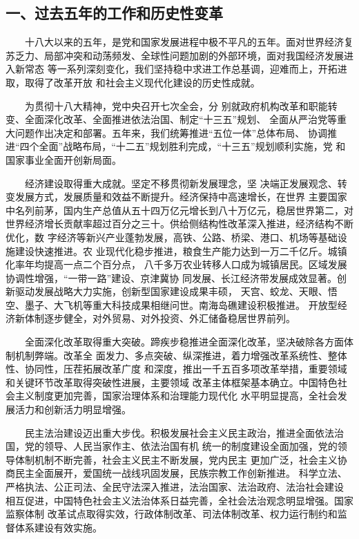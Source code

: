 \documentclass[11pt]{ctexart}
\begin{document}
{{{{\subsection{一、过去五年的工作和历史性变革}
\label{sec:org8690c9d}

　　十八大以来的五年，是党和国家发展进程中极不平凡的五年。面对世界经济复
苏乏力、局部冲突和动荡频发、全球性问题加剧的外部环境，面对我国经济发展进入新常态
等一系列深刻变化，我们坚持稳中求进工作总基调，迎难而上，开拓进取，取得了改革开放
和社会主义现代化建设的历史性成就。

　　为贯彻十八大精神，党中央召开七次全会，分
别就政府机构改革和职能转变、全面深化改革、全面推进依法治国、制定“十三五”规划、
全面从严治党等重大问题作出决定和部署。五年来，我们统筹推进“五位一体”总体布局、
协调推进“四个全面”战略布局，“十二五”规划胜利完成，“十三五”规划顺利实施，党
和国家事业全面开创新局面。

　　经济建设取得重大成就。坚定不移贯彻新发展理念，坚
决端正发展观念、转变发展方式，发展质量和效益不断提升。经济保持中高速增长，在世界
主要国家中名列前茅，国内生产总值从五十四万亿元增长到八十万亿元，稳居世界第二，对
世界经济增长贡献率超过百分之三十。供给侧结构性改革深入推进，经济结构不断优化，数
字经济等新兴产业蓬勃发展，高铁、公路、桥梁、港口、机场等基础设施建设快速推进。农
业现代化稳步推进，粮食生产能力达到一万二千亿斤。城镇化率年均提高一点二个百分点，
八千多万农业转移人口成为城镇居民。区域发展协调性增强，“一带一路”建设、京津冀协
同发展、长江经济带发展成效显著。创新驱动发展战略大力实施，创新型国家建设成果丰硕，
天宫、蛟龙、天眼、悟空、墨子、大飞机等重大科技成果相继问世。南海岛礁建设积极推进。
开放型经济新体制逐步健全，对外贸易、对外投资、外汇储备稳居世界前列。

　　全面深化改革取得重大突破。蹄疾步稳推进全面深化改革，坚决破除各方面体制机制弊端。改革全
面发力、多点突破、纵深推进，着力增强改革系统性、整体性、协同性，压茬拓展改革广度
和深度，推出一千五百多项改革举措，重要领域和关键环节改革取得突破性进展，主要领域
改革主体框架基本确立。中国特色社会主义制度更加完善，国家治理体系和治理能力现代化
水平明显提高，全社会发展活力和创新活力明显增强。

　　民主法治建设迈出重大步伐。积极发展社会主义民主政治，推进全面依法治国，党的领导、人民当家作主、依法治国有机
统一的制度建设全面加强，党的领导体制机制不断完善，社会主义民主不断发展，党内民主
更加广泛，社会主义协商民主全面展开，爱国统一战线巩固发展，民族宗教工作创新推进。
科学立法、严格执法、公正司法、全民守法深入推进，法治国家、法治政府、法治社会建设
相互促进，中国特色社会主义法治体系日益完善，全社会法治观念明显增强。国家监察体制
改革试点取得实效，行政体制改革、司法体制改革、权力运行制约和监督体系建设有效实施。

}}}}
\end{document}

